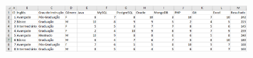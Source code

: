 \documentclass[conference]{IEEEtran}
\begin{document}
\vspace{7mm}
\centerline{\includegraphics[width=90mm,height=600mm,keepaspectratio]{Tabela1.png}}
\vspace{7mm}
\end{document}
